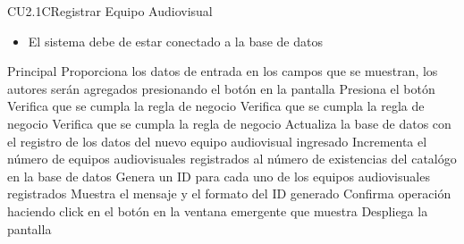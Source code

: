 \begin{UseCase}{CU2.1C}{Registrar Equipo Audiovisual}
{\begin{itemize}
				\item El sistema debe de estar conectado a la base de datos
			\end{itemize}
		}
\end{UseCase}


\begin{UCtrayectoria}{Principal}
		\UCpaso[\UCactor] Proporciona los datos de entrada en los campos que se muestran, los autores serán agregados presionando el botón   en la pantalla 
		\UCpaso[\UCactor] Presiona el botón  
		\UCpaso[\UCsist] Verifica que se cumpla la regla de negocio  
		\UCpaso[\UCsist] Verifica que se cumpla la regla de negocio  
		\UCpaso[\UCsist] Verifica que se cumpla la regla de negocio  
		\UCpaso[\UCsist] Actualiza la base de datos con el registro de los datos del nuevo equipo audiovisual ingresado 
		\UCpaso[\UCsist] Incrementa el número de equipos audiovisuales registrados al número de existencias del catalógo en la base de datos
		\UCpaso[\UCsist] Genera un ID para cada uno de los equipos audiovisuales registrados
		\UCpaso[\UCsist] Muestra el mensaje  y el formato del ID generado
		\UCpaso[\UCactor] Confirma operación haciendo click en el botón  en la ventana emergente que muestra
		\UCpaso[\UCsist] Despliega la pantalla 
\end{UCtrayectoria}


